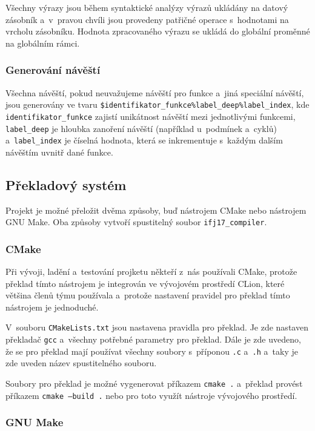 \documentclass[a4paper, 11pt]{article}
\begin{document}
	Všechny výrazy jsou během syntaktické analýzy výrazů ukládány na datový zásobník a~v~pravou
	chvíli jsou provedeny patřičné operace s~hodnotami na vrcholu zásobníku. Hodnota zpracovaného
	výrazu se ukládá do globální proměnné na globálním rámci.

	\subsubsection{Generování návěští}

	Všechna návěští, pokud neuvažujeme návěští pro funkce a~jiná speciální návěští, jsou generovány
	ve tvaru \texttt{\$identifikator\_funkce\%label\_deep\%label\_index}, kde
	\texttt{identifikator\_funkce} zajistí unikátnost návěští mezi jednotlivými funkcemi,
	\texttt{label\_deep} je hloubka zanoření návěští (například u~podmínek a~cyklů)
	a~\texttt{label\_index} je číselná hodnota, která se inkrementuje s~každým dalším návěštím uvnitř
	dané funkce.


	\subsection{Překladový systém}

	Projekt je možné přeložit dvěma způsoby, buď nástrojem CMake nebo nástrojem GNU Make. Oba způsoby vytvoří
	spustitelný soubor \texttt{ifj17\_compiler}.

	\subsubsection{CMake}

	Při vývoji, ladění a~testování projketu někteří z~nás používali CMake, protože překlad tímto nástrojem
	je integrován ve vývojovém prostředí CLion, které většina členů týmu používala a~protože nastavení pravidel
	pro překlad tímto nástrojem je jednoduché.

	V~souboru \texttt{CMakeLists.txt} jsou nastavena pravidla pro překlad. Je zde nastaven překladač \texttt{gcc}
	a~všechny potřebné parametry pro překlad. Dále je zde uvedeno, že se pro překlad mají používat všechny soubory s~příponou
	\texttt{.c} a~\texttt{.h} a~taky je zde uveden název spustitelného souboru.

	Soubory pro překlad je možné vygenerovat příkazem \texttt{cmake~.} a~překlad provést příkazem \texttt{cmake~--build~.}
	nebo pro toto využít nástroje vývojového prostředí.

	\subsubsection{GNU Make}
\end{document}

